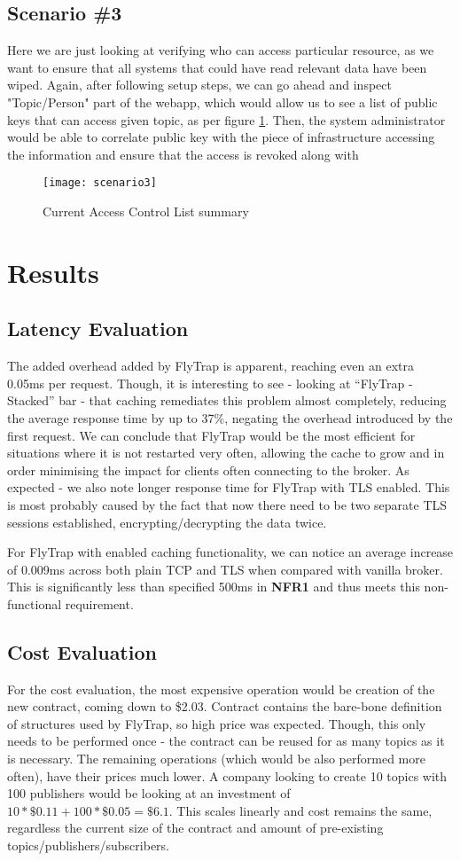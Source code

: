 \subsection{Scenario \#3}
Here we are just looking at verifying who can access particular resource, as we want to ensure that all systems that could have read relevant data have been wiped. Again, after following setup steps, we can go ahead and inspect "Topic/Person" part of the webapp, which would allow us to see a list of public keys that can access given topic, as per figure \ref{fig:scenario3}. Then, the system administrator would be able to correlate public key with the piece of infrastructure accessing the information and ensure that the access is revoked along with 
\begin{figure}[h]
    \centering
    \texttt{[image: scenario3]}
    \caption{Current Access Control List summary}
    \label{fig:scenario3}
\end{figure}
\section{Results}
\subsection{Latency Evaluation}
The added overhead added by FlyTrap is apparent, reaching even an extra 0.05ms per request. Though, it is interesting to see - looking at ``FlyTrap - Stacked'' bar - that caching remediates this problem almost completely, reducing the average response time by up to 37\%, negating the overhead introduced by the first request. We can conclude that FlyTrap would be the most efficient for situations where it is not restarted very often, allowing the cache to grow and in order minimising the impact for clients often connecting to the broker. As expected - we also note longer response time for FlyTrap with TLS enabled. This is most probably caused by the fact that now there need to be two separate TLS sessions established, encrypting/decrypting the data twice.

For FlyTrap with enabled caching functionality, we can notice an average increase of 0.009ms across both plain TCP and TLS when compared with vanilla broker. This is significantly less than specified 500ms in \textbf{NFR1} and thus meets this non-functional requirement.
\subsection{Cost Evaluation}
For the cost evaluation, the most expensive operation would be creation of the new contract, coming down to \$2.03. Contract contains the bare-bone definition of structures used by FlyTrap, so high price was expected. Though, this only needs to be performed once - the contract can be reused for as many topics as it is necessary. The remaining operations (which would be also performed more often), have their prices much lower. A company looking to create 10 topics with 100 publishers would be looking at an investment of $10 * \$0.11 + 100 * \$0.05 = \$6.1$. This scales linearly and cost remains the same, regardless the current size of the contract and amount of pre-existing topics/publishers/subscribers.
